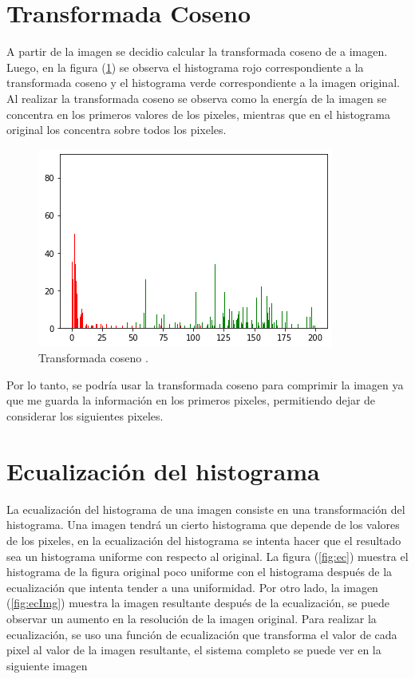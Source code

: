 \section{Transformada Coseno}

A partir de la imagen se decidio calcular la transformada coseno de a imagen. Luego, en la figura (\ref{fig:tc}) se observa el histograma rojo correspondiente a la transformada coseno y el histograma verde correspondiente a la imagen original. Al realizar la transformada coseno se observa como la energía de la imagen se concentra en los primeros valores de los pixeles, mientras que en el histograma original los concentra sobre todos los pixeles. 

\begin{figure}[H]
	\centering
	\includegraphics[scale=0.5]{imagenes/transformadaCoseno.png}

	\caption{Transformada coseno \label{fig:tc}.}
\end{figure}

Por lo tanto, se podría usar la transformada coseno para comprimir la imagen ya que me guarda la información en los primeros pixeles, permitiendo dejar de considerar los siguientes pixeles.

\section{Ecualización del histograma}

	La ecualización del histograma de una imagen consiste en una transformación del histograma. Una imagen tendrá un cierto histograma que depende de los valores de los pixeles, en la ecualización del histograma se intenta hacer que el resultado sea un histograma uniforme con respecto al original. La figura (\ref{fig:ec}) muestra el histograma de la figura original poco uniforme con el histograma después de la ecualización que intenta tender a una uniformidad. Por otro lado, la imagen (\ref{fig:ecImg}) muestra la imagen resultante después de la ecualización, se puede observar un aumento en la resolución de la imagen original. Para realizar la ecualización, se uso una función de ecualización que transforma el valor de cada pixel al valor de la imagen resultante, el sistema completo se puede ver en la siguiente imagen

